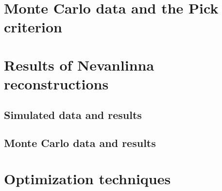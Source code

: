 \section{Monte Carlo data and the Pick criterion}

\section{Results of Nevanlinna reconstructions}
\label{sec:nevanlinna_simulations}

\subsection{Simulated data and results}

\subsection{Monte Carlo data and results}

\section{Optimization techniques}


%


